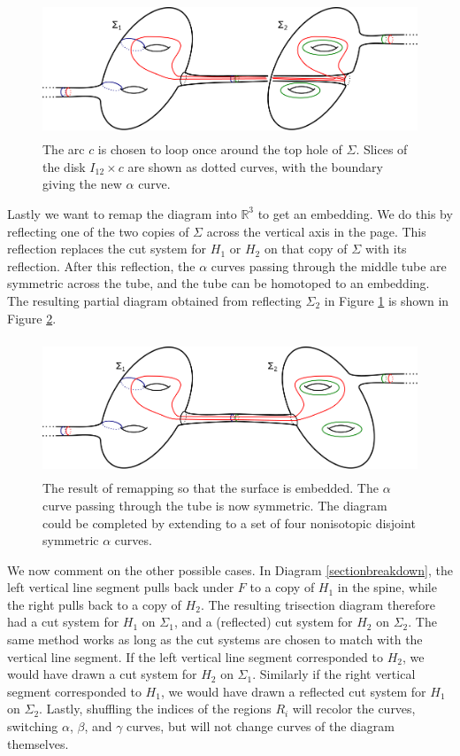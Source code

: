 \documentclass[12pt]{amsart}
\newcommand{\R}{\mathbb{R}}
\theoremstyle{definition}
\theoremstyle{remark}
\begin{document}
\begin{figure}[h]
\centering
\includegraphics[height=1.6in]{coresubsurfacediagram.png}
\caption{The arc $c$ is chosen to loop once around the top hole of $\Sigma$.  Slices of the disk $I_{12} \times c$ are shown as dotted curves, with the boundary giving the new $\alpha$ curve.}
\label{fig_coresubsurfacediagram}
\end{figure}

Lastly we want to remap the diagram into $\R^3$ to get an embedding.  We do this by reflecting one of the two copies of $\Sigma$ across the vertical axis in the page.  This reflection replaces the cut system for $H_1$ or $H_2$ on that copy of $\Sigma$ with its reflection.  After this reflection, the $\alpha$ curves passing through the middle tube are symmetric across the tube, and the tube can be homotoped to an embedding.  The resulting partial diagram obtained from reflecting $\Sigma_2$ in Figure \ref{fig_coresubsurfacediagram} is shown in Figure \ref{fig_coresubsurfacediagram_embedded}.

\begin{figure}[h]
\centering
\includegraphics[height=1.6in]{coresubsurfacediagram_embedded.png}
\caption{The result of remapping so that the surface is embedded.  The $\alpha$ curve passing through the tube is now symmetric.  The diagram could be completed by extending to a set of four nonisotopic disjoint symmetric $\alpha$ curves.}
\label{fig_coresubsurfacediagram_embedded}
\end{figure}

We now comment on the other possible cases.  In Diagram \ref{sectionbreakdown}, the left vertical line segment pulls back under $F$ to a copy of $H_1$ in the spine, while the right pulls back to a copy of $H_2$.  The resulting trisection diagram therefore had a cut system for $H_1$ on $\Sigma_1$, and a (reflected) cut system for $H_2$ on $\Sigma_2$.  The same method works as long as the cut systems are chosen to match with the vertical line segment.  If the left vertical line segment corresponded to $H_2$, we would have drawn a cut system for $H_2$ on $\Sigma_1$.  Similarly if the right vertical segment corresponded to $H_1$, we would have drawn a reflected cut system for $H_1$ on $\Sigma_2$.  Lastly, shuffling the indices of the regions $R_i$ will recolor the curves, switching $\alpha$, $\beta$, and $\gamma$ curves, but will not change curves of the diagram themselves.
\end{document}
